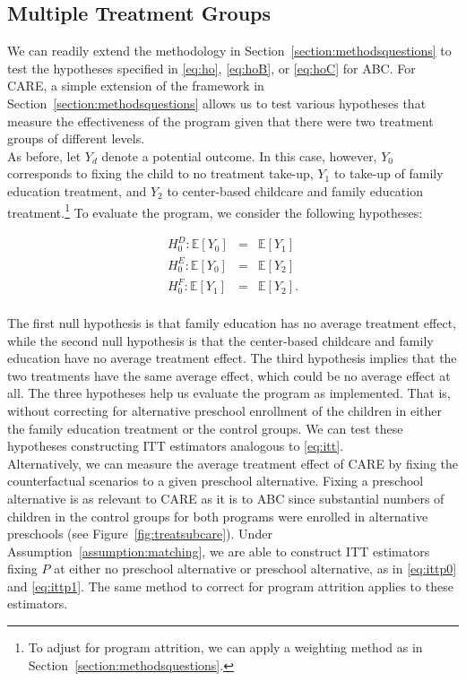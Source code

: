 \subsection{Multiple Treatment Groups}

\noindent We can readily extend the methodology in Section~\ref{section:methodsquestions} to test the hypotheses specified in \eqref{eq:ho}, \eqref{eq:hoB}, or \eqref{eq:hoC} for ABC. For CARE, a simple extension of the framework in Section~\ref{section:methodsquestions} allows us to test various hypotheses that measure the effectiveness of the program given that there were two treatment groups of different levels.\\

\noindent As before, let $Y_{d}$ denote a potential outcome. In this case, however, $Y_{0}$ corresponds to fixing the child to no treatment take-up,  $Y_{1}$ to take-up of family education treatment, and $Y_{2}$ to center-based childcare and family education treatment.\footnote{To adjust for program attrition, we can apply a weighting method as in Section~\ref{section:methodsquestions}.} To evaluate the program, we consider the following hypotheses: 

\begin{eqnarray}
H_{0}^D: \mathbb{E} \left[ Y_{0} \right] &=&  \mathbb{E} \left[ Y_{1} \right] \\ 
H_{0}^E: \mathbb{E} \left[ Y_{0} \right] &=&  \mathbb{E} \left[ Y_{2} \right] \\
H_{0}^F: \mathbb{E} \left[ Y_{1} \right] &=&  \mathbb{E} \left[ Y_{2} \right]. 
\end{eqnarray}\\

\noindent The first null hypothesis is that family education has no average treatment effect, while the second null hypothesis is that the center-based childcare and family education have no average treatment effect. The third hypothesis implies that the two treatments have the same average effect, which could be no average effect at all. The three hypotheses help us evaluate the program as implemented. That is, without correcting for alternative preschool enrollment of the children in either the family education treatment or the control groups. We can test these hypotheses constructing ITT estimators analogous to \eqref{eq:itt}.\\ 

\noindent Alternatively, we can measure the average treatment effect of CARE by fixing the counterfactual scenarios to a given preschool alternative. Fixing a preschool alternative is as relevant to CARE as it is to ABC since substantial numbers of children in the control groups for both programs were enrolled in alternative preschools (see Figure~\ref{fig:treatsubcare}). Under Assumption~\ref{assumption:matching}, we are able to construct ITT estimators fixing $P$ at either no preschool alternative or preschool alternative, as in \eqref{eq:ittp0} and \eqref{eq:ittp1}. The same method to correct for program attrition applies to these estimators.

